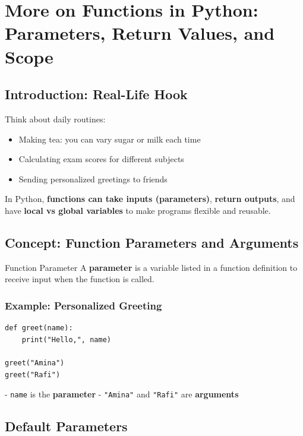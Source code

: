 \chapter{More on Functions in Python: Parameters, Return Values, and Scope}

\section{Introduction: Real-Life Hook}

Think about daily routines:

\begin{itemize}
    \item Making tea: you can vary sugar or milk each time  
    \item Calculating exam scores for different subjects  
    \item Sending personalized greetings to friends  
\end{itemize}

In Python, \textbf{functions can take inputs (parameters)}, \textbf{return outputs}, and have \textbf{local vs global variables} to make programs flexible and reusable.

\section{Concept: Function Parameters and Arguments}

\begin{definition}{Function Parameter}
A \textbf{parameter} is a variable listed in a function definition to receive input when the function is called.
\end{definition}

\subsection{Example: Personalized Greeting}

\begin{verbatim}
def greet(name):
    print("Hello,", name)

greet("Amina")
greet("Rafi")
\end{verbatim}

- \texttt{name} is the \textbf{parameter}  
- \texttt{"Amina"} and \texttt{"Rafi"} are \textbf{arguments}

\section{Default Parameters}

